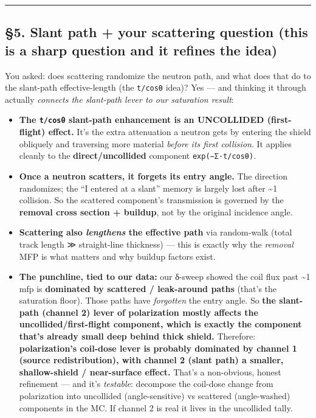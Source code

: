 \documentclass[
]{article}
\providecommand{\tightlist}{%
  \setlength{\itemsep}{0pt}\setlength{\parskip}{0pt}}
\begin{document}
\begin{center}\rule{0.5\linewidth}{0.5pt}\end{center}

\subsection{§5. Slant path + your scattering question (this is a sharp
question and it refines the
idea)}\label{slant-path-your-scattering-question-this-is-a-sharp-question-and-it-refines-the-idea}

You asked: does scattering randomize the neutron path, and what does
that do to the slant-path effective-length (the \texttt{t/cosθ} idea)?
Yes --- and thinking it through actually \emph{connects the slant-path
lever to our saturation result}:

\begin{itemize}
\tightlist
\item
  \textbf{The \texttt{t/cosθ} slant-path enhancement is an UNCOLLIDED
  (first-flight) effect.} It's the extra attenuation a neutron gets by
  entering the shield obliquely and traversing more material
  \emph{before its first collision}. It applies cleanly to the
  \textbf{direct/uncollided} component \texttt{exp(−Σ·t/cosθ)}.
\item
  \textbf{Once a neutron scatters, it forgets its entry angle.} The
  direction randomizes; the ``I entered at a slant'' memory is largely
  lost after \textasciitilde1 collision. So the scattered component's
  transmission is governed by the \textbf{removal cross section +
  buildup}, not by the original incidence angle.
\item
  \textbf{Scattering also \emph{lengthens} the effective path} via
  random-walk (total track length ≫ straight-line thickness) --- this is
  exactly why the \emph{removal} MFP is what matters and why buildup
  factors exist.
\item
  \textbf{The punchline, tied to our data:} our δ-sweep showed the coil
  flux past \textasciitilde1 mfp is \textbf{dominated by scattered /
  leak-around paths} (that's the saturation floor). Those paths have
  \emph{forgotten} the entry angle. So \textbf{the slant-path (channel
  2) lever of polarization mostly affects the uncollided/first-flight
  component, which is exactly the component that's already small deep
  behind thick shield.} Therefore: \textbf{polarization's coil-dose
  lever is probably dominated by channel 1 (source redistribution), with
  channel 2 (slant path) a smaller, shallow-shield / near-surface
  effect.} That's a non-obvious, honest refinement --- and it's
  \emph{testable}: decompose the coil-dose change from polarization into
  uncollided (angle-sensitive) vs scattered (angle-washed) components in
  the MC. If channel 2 is real it lives in the uncollided tally.
\end{itemize}
\end{document}
